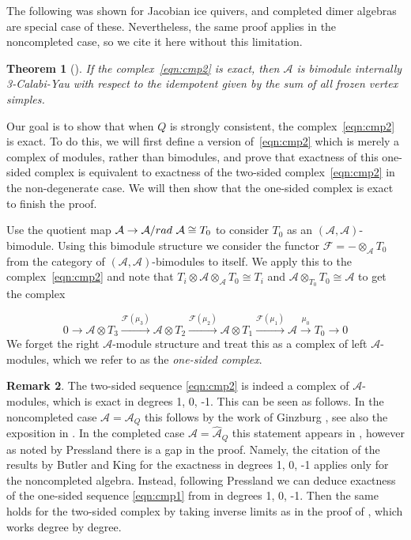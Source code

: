 \documentclass{article}
\newtheorem{thm}{Theorem}[section]
\theoremstyle{definition}
\newtheorem{remk}[thm]{Remark}
\newcommand{\A}{{\mathcal A}}
\begin{document}
The following was shown for Jacobian ice quivers, and completed dimer algebras are special case of these.  Nevertheless, the same proof applies in the noncompleted case, so we cite it here without this limitation. 

\begin{thm}[{\cite[Theorem 5.6]{XPressland2015}}]
	\label{thm:bim3cy}
	If the complex~\eqref{eqn:cmp2} is exact, then $\A$ is bimodule internally 3-Calabi-Yau with respect to the idempotent given by the sum of all frozen vertex simples.
\end{thm}

Our goal is to show that when $Q$ is strongly consistent, the complex~\eqref{eqn:cmp2} is exact. 
To do this, we will first define a version of~\eqref{eqn:cmp2} which is merely a complex of modules, rather than bimodules, and prove that exactness of this one-sided complex is equivalent to exactness of the two-sided complex~\eqref{eqn:cmp2} in the non-degenerate case. We will then show that the one-sided complex is exact to finish the proof.

Use the quotient map $\A\to \A/\textup{rad}\ \A\cong T_0$ to consider $T_0$ as an $(\A,\A)$-bimodule. Using this bimodule structure we consider the functor $\mathcal F=-\otimes_\A T_0$ from the category of $(\A,\A)$-bimodules to itself. We apply this to the complex~\eqref{eqn:cmp2} and note that 
$T_i\otimes\A\otimes_\A T_0\cong T_i$ and $\A\otimes_{T_0}T_0\cong\A$ to get the complex

\begin{equation}\label{eqn:cmp1}0\to \A\otimes T_3\xrightarrow{\mathcal F(\mu_3)}\A\otimes T_2\xrightarrow{\mathcal F(\mu_2)}\A\otimes T_1\xrightarrow{\mathcal F(\mu_1)} \A\xrightarrow{\mu_0}T_0\to0\end{equation}
We forget the right $\A$-module structure and treat this as a complex of left $\A$-modules, which we refer to as the \textit{one-sided complex}.

\begin{remk}\label{rem:bimodule}
The two-sided sequence \eqref{eqn:cmp2} is indeed a complex of $\A$-modules, which is exact in degrees 1, 0, -1.  This can be seen as follows.  In the noncompleted case $\A = \A_Q$  this follows by the work of Ginzburg \cite[Proposition 5.1.9 and Theorem 5.3.1]{Ginz}, see also the exposition in \cite[Section 7.1]{XBroomhead2009}.  In the completed case $\A = \widehat \A_Q$ this statement appears in  \cite[Lemma 5.5]{XPressland2015}, however as noted by Pressland \cite{PRESSPR} there is a gap in the proof.  Namely,  the citation of the results by Butler and King for the exactness in degrees 1, 0, -1 applies only for the noncompleted algebra.  Instead, following Pressland \cite{PRESSPR} we can deduce exactness of the one-sided sequence \eqref{eqn:cmp1} from \cite[Proposition 3.3]{BIRS} in degrees 1, 0, -1.  Then the same holds for the two-sided complex by taking inverse limits as in the proof of \cite[Lemma 4.7]{XPressland2017}, which works degree by degree. 
\end{remk}
\end{document}
